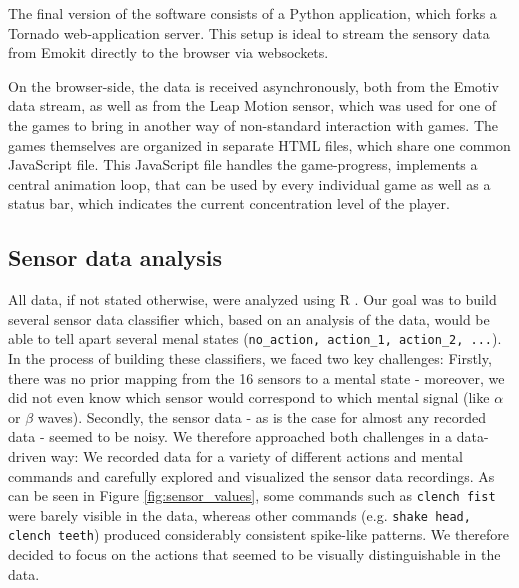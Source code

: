 \documentclass{utue} %
\begin{document}
The final version of the software consists of a Python application, which forks a Tornado web-application server. This setup is ideal to stream the sensory data from Emokit directly to the browser via websockets. 

On the browser-side, the data is received asynchronously, both from the Emotiv data stream, as well as from the Leap Motion sensor, which was used for one of the games to bring in another way of non-standard interaction with games. The games themselves are organized in separate HTML files, which share one common JavaScript file. This JavaScript file handles the game-progress, implements a central animation loop, that can be used by every individual game as well as a status bar, which indicates the current concentration level of the player.

\subsection{Sensor data analysis} %
All data, if not stated otherwise, were analyzed using R \cite{RCoreTeam}. Our goal was to build several sensor data classifier which, based on an analysis of the data, would be able to tell apart several menal states (\texttt{no\_action, action\_1, action\_2, ...}). In the process of building these classifiers, we faced two key challenges: Firstly, there was no prior mapping from the 16 sensors to a mental state - moreover, we did not even know which sensor would correspond to which mental signal (like $ \alpha $ or $ \beta $ waves). Secondly, the sensor data - as is the case for almost any recorded data - seemed to be noisy. We therefore approached both challenges in a data-driven way: We recorded data for a variety of different actions and mental commands and carefully explored and visualized the sensor data recordings. As can be seen in Figure \ref{fig:sensor_values}, some commands such as \texttt{clench fist} were barely visible in the data, whereas other commands (e.g. \texttt{shake head, clench teeth}) produced considerably consistent spike-like patterns. We therefore decided to focus on the actions that seemed to be visually distinguishable in the data.
\end{document}
